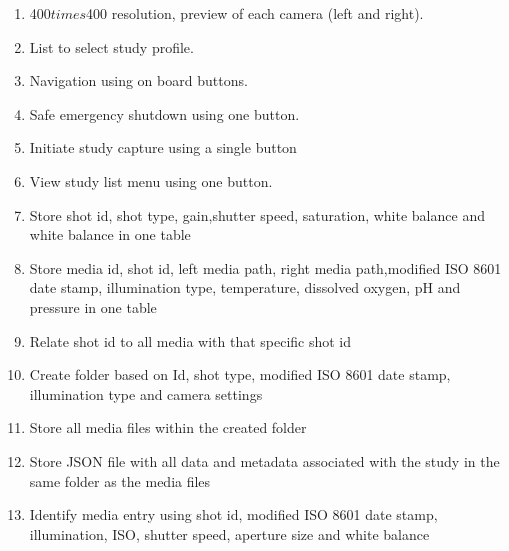 \begin{enumerate}
    \item 400$times$400 resolution, preview of each camera (left and right).
    \item List to select study profile.
	\item Navigation using on board buttons.
	\item Safe emergency shutdown using one button.
	\item Initiate study capture using a single button
	\item View study list menu using one button.
	\item Store shot id, shot type, gain,shutter speed, saturation, white balance and white balance in one table
	\item Store media id, shot id, left media path, right media path,modified ISO 8601 date stamp, illumination type, temperature, dissolved oxygen, pH and pressure in one table
	\item Relate shot id to all media with that specific shot id
	\item Create folder based on Id, shot type, modified ISO 8601 date stamp, illumination type and camera settings
	\item Store all media files within the created folder
	\item Store JSON file with all data and metadata associated with the study in the same folder as the media files
	\item Identify media entry using shot id, modified ISO 8601 date stamp, illumination, ISO, shutter speed, aperture size and white balance
\end{enumerate}